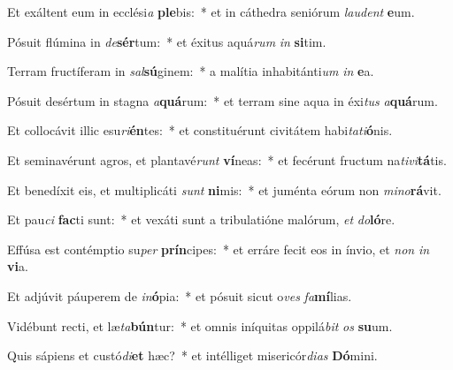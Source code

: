 \item Et exáltent eum in ecclési\textit{a} \textbf{ple}bis:~* et in cáthedra seniórum \textit{lau}\textit{dent} \textbf{e}um.
\item Pósuit flúmina in \textit{de}\textbf{sér}tum:~* et éxitus aquá\textit{rum} \textit{in} \textbf{si}tim.
\item Terram fructíferam in \textit{sal}\textbf{sú}ginem:~* a malítia inhabitánti\textit{um} \textit{in} \textbf{e}a.
\item Pósuit desértum in stagna \textit{a}\textbf{quá}rum:~* et terram sine aqua in éxi\textit{tus} \textit{a}\textbf{quá}rum.
\item Et collocávit illic esu\textit{ri}\textbf{én}tes:~* et constituérunt civitátem habi\textit{ta}\textit{ti}\textbf{ó}nis.
\item Et seminavérunt agros, et plantavé\textit{runt} \textbf{ví}neas:~* et fecérunt fructum na\textit{ti}\textit{vi}\textbf{tá}tis.
\item Et benedíxit eis, et multiplicáti \textit{sunt} \textbf{ni}mis:~* et juménta eórum non \textit{mi}\textit{no}\textbf{rá}vit.
\item Et pau\textit{ci} \textbf{fac}ti sunt:~* et vexáti sunt a tribulatióne malórum, \textit{et} \textit{do}\textbf{ló}re.
\item Effúsa est contémptio su\textit{per} \textbf{prín}cipes:~* et erráre fecit eos in ínvio, et \textit{non} \textit{in} \textbf{vi}a.
\item Et adjúvit páuperem de \textit{in}\textbf{ó}pia:~* et pósuit sicut o\textit{ves} \textit{fa}\textbf{mí}lias.
\item Vidébunt recti, et læ\textit{ta}\textbf{bún}tur:~* et omnis iníquitas oppilá\textit{bit} \textit{os} \textbf{su}um.
\item Quis sápiens et custó\textit{di}\textbf{et} hæc?~* et intélliget misericór\textit{di}\textit{as} \textbf{Dó}mini.
